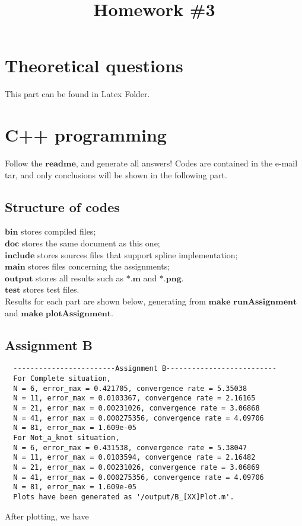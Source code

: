 \documentclass{article}
\begin{document}
\title{Homework \#3}
\pagestyle{fancy}

\section{Theoretical questions}
This part can be found in Latex Folder.

\section{C++ programming}
Follow the $\textbf{readme}$, and generate all answers! 
Codes are contained in the e-mail tar, and only conclusions will be shown in the following part.

\subsection{\textbf{Structure of codes}}
$\textbf{bin}$ stores compiled files;\\
$\textbf{doc}$ stores the same document as this one;\\
$\textbf{include}$ stores sources files that support spline implementation;\\
$\textbf{main}$ stores files concerning the assignments;\\
$\textbf{output}$ stores all results such as $\textbf{*.m}$ and $\textbf{*.png}$.\\
$\textbf{test}$ stores test files.\\
Results for each part are shown below, generating from $ \textbf{make runAssignment} $ and $ \textbf{make plotAssignment} $.
\subsection{\textbf{Assignment B}}
\lstset{language=C++}
\begin{lstlisting}
  ------------------------Assignment B--------------------------
  For Complete situation, 
  N = 6, error_max = 0.421705, convergence rate = 5.35038
  N = 11, error_max = 0.0103367, convergence rate = 2.16165
  N = 21, error_max = 0.00231026, convergence rate = 3.06868
  N = 41, error_max = 0.000275356, convergence rate = 4.09706
  N = 81, error_max = 1.609e-05
  For Not_a_knot situation, 
  N = 6, error_max = 0.431538, convergence rate = 5.38047
  N = 11, error_max = 0.0103594, convergence rate = 2.16482
  N = 21, error_max = 0.00231026, convergence rate = 3.06869
  N = 41, error_max = 0.000275356, convergence rate = 4.09706
  N = 81, error_max = 1.609e-05
  Plots have been generated as '/output/B_[XX]Plot.m'.
\end{lstlisting}
After plotting, we have
\end{document}
